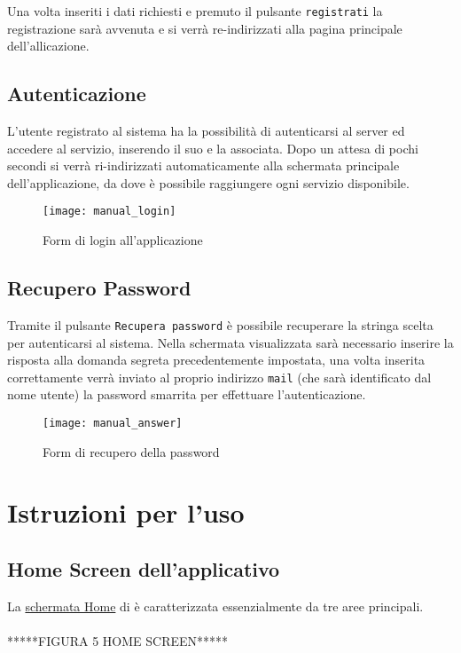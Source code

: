 Una volta inseriti i dati richiesti e premuto il pulsante \texttt{registrati} la registrazione sarà avvenuta e si verrà re-indirizzati alla pagina principale dell'allicazione.

\subsection{Autenticazione}
L'utente registrato al sistema ha la possibilità di autenticarsi al server \caName{} ed accedere al servizio, inserendo il suo  e la  associata.
Dopo un attesa di pochi secondi si verrà ri-indirizzati automaticamente alla schermata principale dell'applicazione, da dove è possibile raggiungere ogni servizio disponibile.

\begin{figure}[H]
  \texttt{[image: manual\_login]}
\caption{Form di login all'applicazione}\label{fig:login}
\end{figure}

\subsection{Recupero Password}
Tramite il pulsante \texttt{Recupera password} è possibile recuperare la stringa scelta per autenticarsi al sistema. Nella schermata visualizzata sarà necessario inserire la risposta alla domanda segreta precedentemente impostata, una volta inserita correttamente verrà inviato al proprio indirizzo \texttt{mail} (che sarà identificato dal nome utente) la password smarrita per effettuare l'autenticazione.

\begin{figure}[H]
  \texttt{[image: manual\_answer]}
\caption{Form di recupero della password}\label{fig:answer}
\end{figure}


\section{Istruzioni per l'uso}
\subsection{Home Screen dell'applicativo }
La \underline{schermata Home} di \caName{} è caratterizzata essenzialmente da tre aree principali.
\\\\*****FIGURA 5 HOME SCREEN*****

